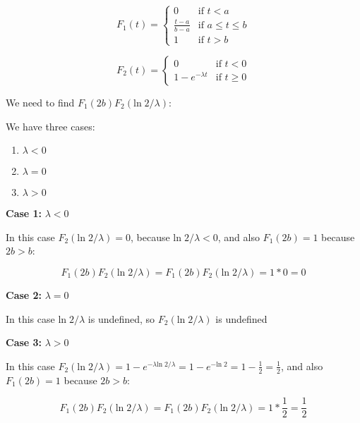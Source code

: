 \begin{equation}
    F_1(t) = \begin{cases}
        0                 & \text{if } t < a           \\
        \frac{t - a}{b-a} & \text{if } a \leq t \leq b \\
        1                 & \text{if } t > b
    \end{cases}
\end{equation}

\singlespacing

\begin{equation}
    F_2(t) = \begin{cases}
        0                  & \text{if } t < 0    \\
        1 - e^{-\lambda t} & \text{if } t \geq 0
    \end{cases}
\end{equation}

\singlespacing

We need to find $F_1(2b)F_2(\text{ln}\; 2/\lambda)$:

\singlespacing

We have three cases:

\singlespacing

\begin{enumerate}
    \item $\lambda < 0$
    \item $\lambda = 0$
    \item $\lambda > 0$
\end{enumerate}

\singlespacing

\textbf{Case 1:} $\lambda < 0$

\singlespacing

In this case $F_2(\text{ln}\; 2/\lambda) = 0$, because $\text{ln}\; 2/\lambda < 0$,
and also $F_1(2b) = 1$ because $2b > b$:

\singlespacing

\begin{equation}
    F_1(2b)F_2(\text{ln}\; 2/\lambda) = F_1(2b)F_2(\text{ln}\; 2/\lambda) = 1 * 0 = 0
\end{equation}

\singlespacing

\textbf{Case 2:} $\lambda = 0$

\singlespacing

In this case $\text{ln}\; 2/\lambda$ is undefined, so $F_2(\text{ln}\; 2/\lambda)$ is undefined

\singlespacing

\textbf{Case 3:} $\lambda > 0$

\singlespacing

In this case $F_2(\text{ln}\; 2/\lambda) = 1 - e^{-\lambda \text{ln}\; 2/\lambda} = 1 - e^{-\text{ln}\; 2} = 1 - \frac{1}{2} = \frac{1}{2}$,
and also $F_1(2b) = 1$ because $2b > b$:

\singlespacing

\begin{equation}
    F_1(2b)F_2(\text{ln}\; 2/\lambda) = F_1(2b)F_2(\text{ln}\; 2/\lambda) = 1 * \frac{1}{2} = \frac{1}{2}
\end{equation}